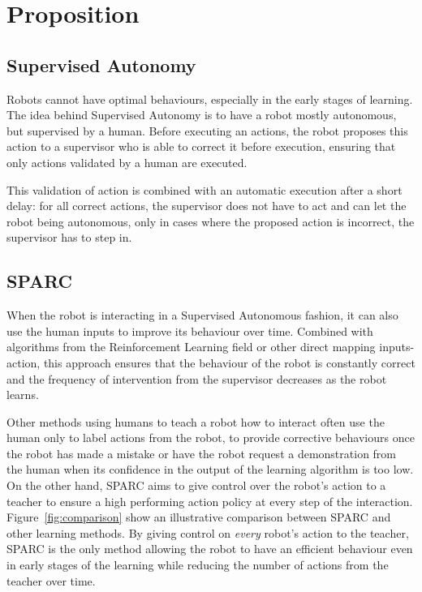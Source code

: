 \documentclass[conference]{IEEEtran}
\begin{document}
\section{Proposition}

\subsection{Supervised Autonomy}

Robots cannot have optimal behaviours, especially in the early stages of
learning. The idea behind Supervised Autonomy is to have a robot mostly
autonomous, but supervised by a human. Before executing an actions, the robot
proposes this action to a supervisor who is able to correct it before execution,
ensuring that only actions validated by a human are executed. 

This validation of action is combined with an automatic execution after a short
delay: for all correct actions, the supervisor does not have to act and can let
the robot being autonomous, only in cases where the proposed action is
incorrect, the supervisor has to step in.

\subsection{SPARC}

When the robot is interacting in a Supervised Autonomous fashion, it can also
use the human inputs to improve its behaviour over time. Combined with
algorithms from the Reinforcement Learning field or other direct mapping
inputs-action, this approach ensures that the behaviour of the robot is
constantly correct and the frequency of intervention from the supervisor
decreases as the robot learns.

Other methods using humans to teach a robot how to interact often use the human
only to label actions from the robot, to provide corrective behaviours once the
robot has made a mistake or have the robot request a demonstration from the
human when its confidence in the output of the learning algorithm is too low.
On the other hand, SPARC aims to give control over the robot's action to a
teacher to ensure a high performing action policy at every step of the
interaction.  Figure~\ref{fig:comparison} show an illustrative comparison
between SPARC and other learning methods. By giving control on \emph{every}
robot's action to the teacher, SPARC is the only method allowing the robot to
have an efficient behaviour even in early stages of the learning while reducing
the number of actions from the teacher over time.
\end{document}
